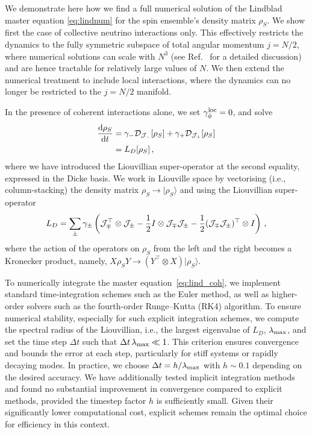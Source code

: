 \documentclass[aps,prd,10pt,twocolumn,superscriptaddress,floatfix,nofootinbib,amsmath,amssymb,altaffilletter,preprintnumbers]{revtex4-1}
\begin{document}
We demonstrate here how we find a full numerical solution of the Lindblad master equation \eqref{eq:lindnum} for the spin ensemble's density matrix $\rho_S$.   We show first the case of collective neutrino interactions only.  This effectively restricts the dynamics to the fully symmetric subspace of total angular momentum $j = N/2$, where numerical solutions can scale with $N^3$ (see Ref.~\cite{PhysRevA.98.063815} for a detailed discussion) and are hence tractable for relatively large values of $N$. We then extend the numerical treatment to include local interactions, where the dynamics can no longer be restricted to the $j = N/2$ manifold.

In the presence of coherent interactions alone, we set $\gamma_{\phi}^{\rm loc}=0$, and solve 
\begin{equation}
\begin{aligned}
    \frac{\mathrm{d} \rho_S}{\mathrm{d}t} &= \gamma_-{\cal D}_{{\cal J}_-}[\rho_S]+\gamma_+{\cal D}_{{\cal J}_+}[\rho_S]\label{eq:lind_coh}\\
    & =L_{D}[\rho_S]\, ,  
\end{aligned} 
\end{equation}
where we have introduced the Liouvillian super-operator at the second equality, expressed in the Dicke basis. We work in Liouville space by vectorising (i.e., column-stacking) the density matrix $\rho_S\to\vert\rho_S\rangle$ and using the Liouvillian super-operator
\begin{equation}
L_D = \sum_{\pm}\gamma_\pm \left( {\cal J}_\mp^\top \otimes {\cal J}_\pm - \frac{1}{2} I \otimes {\cal J}_\mp {\cal J}_\pm - \frac{1}{2} ({\cal J}_\mp {\cal J}_\pm)^\top \otimes I \right)\,,
\end{equation} 
where the action of the operators on $\rho_S$ from the left and the right becomes a Kronecker product, namely, $X \rho_S Y\to(Y^{\top}\otimes X)\vert\rho_S\rangle$.

To numerically integrate the master equation~\eqref{eq:lind_coh}, we implement standard time-integration schemes such as the Euler method, as well as  higher-order solvers such as the fourth-order Runge–Kutta (RK4) algorithm. To ensure numerical stability, especially for such explicit integration schemes,
we compute the spectral radius of the Liouvillian, i.e., the largest eigenvalue of $L_D$,  $\lambda_{\rm max}$, and set the time step $\Delta t$ such that $\Delta t \, \lambda_{\rm max} \ll 1$. This criterion ensures convergence and bounds the error at each step, particularly for stiff systems or rapidly decaying modes. In practice, we choose $\Delta t = h / \lambda_{\rm max}$ with $h\sim 0.1$ depending on the desired accuracy. We have additionally tested implicit integration methods and found no substantial improvement in convergence compared to explicit methods, provided the timestep factor $h$ is sufficiently small. Given their significantly lower computational cost, explicit schemes remain the optimal choice for efficiency in this context. 
\end{document}
